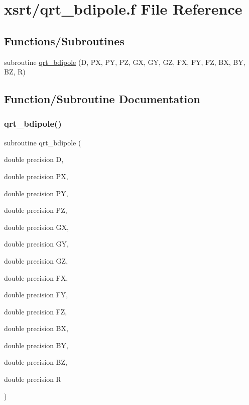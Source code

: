 \hypertarget{qrt__bdipole_8f}{}\section{xsrt/qrt\+\_\+bdipole.f File Reference}
\label{qrt__bdipole_8f}
\subsection*{Functions/\+Subroutines}
\begin{DoxyCompactItemize}
\item 
subroutine \hyperlink{qrt__bdipole_8f_acdea63965540375f3ea00681d26bb9bf}{qrt\+\_\+bdipole} (D, PX, PY, PZ, GX, GY, GZ, FX, FY, FZ, BX, BY, BZ, R)
\end{DoxyCompactItemize}


\subsection{Function/\+Subroutine Documentation}
\mbox{\label{qrt__bdipole_8f_acdea63965540375f3ea00681d26bb9bf}} 
\subsubsection{\texorpdfstring{qrt\+\_\+bdipole()}{qrt\_bdipole()}}
{\footnotesize\ttfamily subroutine qrt\+\_\+bdipole (\begin{DoxyParamCaption}\item[{double precision}]{D,  }\item[{double precision}]{PX,  }\item[{double precision}]{PY,  }\item[{double precision}]{PZ,  }\item[{double precision}]{GX,  }\item[{double precision}]{GY,  }\item[{double precision}]{GZ,  }\item[{double precision}]{FX,  }\item[{double precision}]{FY,  }\item[{double precision}]{FZ,  }\item[{double precision}]{BX,  }\item[{double precision}]{BY,  }\item[{double precision}]{BZ,  }\item[{double precision}]{R }\end{DoxyParamCaption})}

